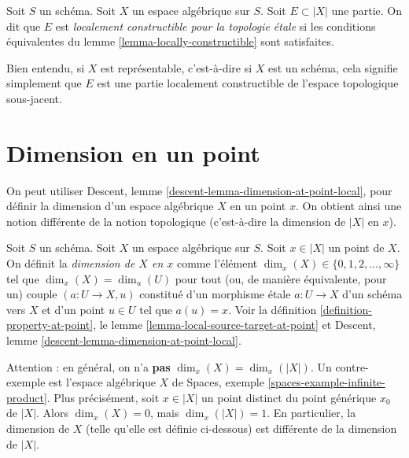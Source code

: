\begin{definition}
\label{definition-locally-constructible}
Soit $S$ un schéma. Soit $X$ un espace algébrique sur $S$.
Soit $E \subset |X|$ une partie. On dit que $E$ est
{\it localement constructible pour la topologie \'etale} si les conditions
équivalentes du lemme \ref{lemma-locally-constructible} sont satisfaites.
\end{definition}

\noindent
Bien entendu, si $X$ est représentable, c'est-à-dire si $X$ est un schéma,
cela signifie simplement que $E$ est une partie localement constructible
de l'espace topologique sous-jacent.







\section{Dimension en un point}
\label{section-dimension}

\noindent
On peut utiliser
Descent, lemme \ref{descent-lemma-dimension-at-point-local},
pour définir la dimension d'un espace
algébrique $X$ en un point $x$. On obtient ainsi une notion différente de la
notion topologique (c'est-à-dire la dimension de $|X|$ en $x$).

\begin{definition}
\label{definition-dimension-at-point}
Soit $S$ un schéma.
Soit $X$ un espace algébrique sur $S$.
Soit $x \in |X|$ un point de $X$.
On définit la {\it dimension de $X$ en $x$} comme
l'élément $\dim_x(X) \in \{0, 1, 2, \ldots, \infty\}$
tel que $\dim_x(X) = \dim_u(U)$ pour tout (ou, de manière équivalente, pour un)
couple $(a : U \to X, u)$ constitué d'un morphisme \'etale $a : U \to X$
d'un schéma vers $X$ et d'un point $u \in U$ tel que $a(u) = x$.
Voir la
définition \ref{definition-property-at-point}, le
lemme \ref{lemma-local-source-target-at-point} et
Descent, lemme \ref{descent-lemma-dimension-at-point-local}.
\end{definition}

\noindent
Attention : en général, on n'a {\bf pas} $\dim_x(X) = \dim_x(|X|)$.
Un contre-exemple est l'espace algébrique $X$ de
Spaces, exemple \ref{spaces-example-infinite-product}.
Plus précisément, soit $x \in |X|$ un point distinct du point générique $x_0$
de $|X|$. Alors $\dim_x(X) = 0$, mais $\dim_x(|X|) = 1$.
En particulier, la dimension de $X$ (telle qu'elle est définie
ci-dessous) est différente de la dimension de $|X|$.

